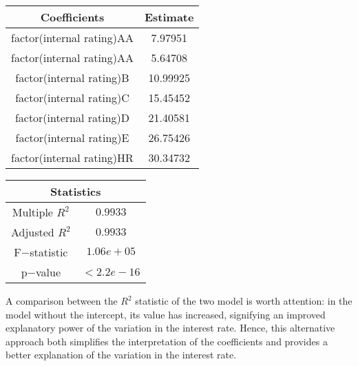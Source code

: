 \documentclass[a4paper,12pt]{article}
\begin{document}
\begin{table}[H]
    \begin{minipage}{0.5\textwidth}
        \centering
        \begin{tabular}{|c|c|}
        \hline
        \textbf{Coefficients} & \textbf{Estimate} \\
        \hline
        factor(internal rating)AA & 7.97951 \\
        \hline
        factor(internal rating)AA & 5.64708 \\
        \hline
        factor(internal rating)B & 10.99925 \\
        \hline
        factor(internal rating)C & 15.45452 \\
        \hline
        factor(internal rating)D & 21.40581 \\
        \hline
        factor(internal rating)E & 26.75426 \\
        \hline
        factor(internal rating)HR & 30.34732 \\
        \hline
        \end{tabular}
    \end{minipage}
    \begin{minipage}{0.5\textwidth}
        \centering
        \begin{tabular}{|c|c|}
            \hline
            \multicolumn{2}{|c|}{\textbf{Statistics}} \\
            \hline
            Multiple $R^2$ & $0.9933$ \\
            \hline
            Adjusted $R^2$ & $0.9933$ \\
            \hline
            F$-$statistic & $1.06e+05$ \\
            \hline
            p$-$value & $< 2.2e-16$ \\
            \hline
        \end{tabular}
    \end{minipage}
\end{table}
A comparison between the $R^2$ statistic of the two model is worth attention: in the model without the intercept, its value has increased, signifying an improved explanatory power of the variation in the interest rate. Hence, this alternative approach both simplifies the interpretation of the coefficients and provides a better explanation of the variation in the interest rate.
\end{document}
